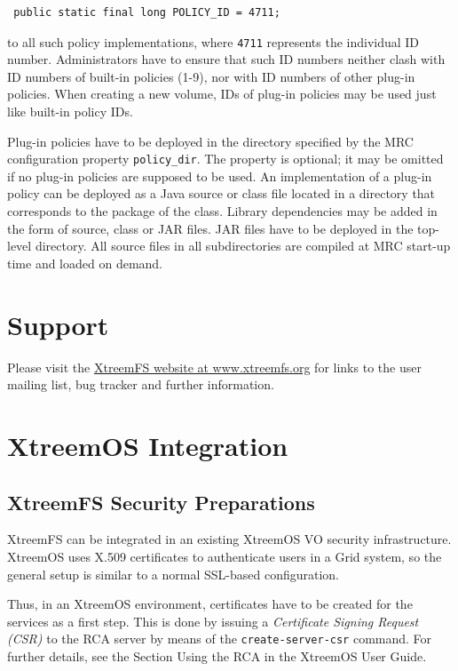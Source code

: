\documentclass[a4paper,10pt]{book}
\begin{document}
\begin{verbatim}
 public static final long POLICY_ID = 4711;
\end{verbatim}

to all such policy implementations, where \texttt{4711} represents the individual ID number. Administrators have to ensure that such ID numbers neither clash with ID numbers of built-in policies (1-9), nor with ID numbers of other plug-in policies. When creating a new volume, IDs of plug-in policies may be used just like built-in policy IDs.

Plug-in policies have to be deployed in the directory specified by the MRC configuration property \texttt{policy\_dir}. The property is optional; it may be omitted if no plug-in policies are supposed to be used. An implementation of a plug-in policy can be deployed as a Java source or class file located in a directory that corresponds to the package of the class. Library dependencies may be added in the form of source, class or JAR files. JAR files have to be deployed in the top-level directory. All source files in all subdirectories are compiled at MRC start-up time and loaded on demand.

\appendix

\chapter{Support}
Please visit the \href{http://www.xtreemfs.org}{XtreemFS website at www.xtreemfs.org} for links to the user mailing list, bug tracker and further information.

\chapter{XtreemOS Integration}

\section{XtreemFS Security Preparations}
\label{installconf-xfs-security}

XtreemFS can be integrated in an existing XtreemOS VO security infrastructure. XtreemOS uses X.509 certificates to authenticate users in a Grid system, so the general setup is similar to a normal SSL-based configuration.

Thus, in an XtreemOS environment, certificates have to be created for the services as a first step. This is done by issuing a \textit{Certificate Signing Request (CSR)} to the RCA server by means of the \texttt{create-server-csr} command. For further details, see the Section Using the RCA in the XtreemOS User Guide.
\end{document}
